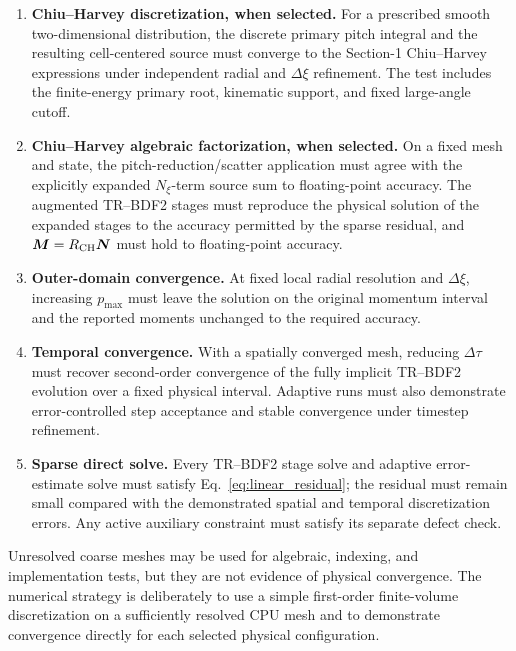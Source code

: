 \documentclass[11pt]{article}
\begin{document}
\begin{enumerate}
 \item \textbf{Chiu--Harvey discretization, when selected.}
       For a prescribed smooth two-dimensional distribution, the discrete primary pitch
       integral and the resulting cell-centered source must converge to the Section-1
       Chiu--Harvey expressions under independent radial and $\Delta\xi$ refinement.
       The test includes the finite-energy primary root, kinematic support, and fixed
       large-angle cutoff.

 \item \textbf{Chiu--Harvey algebraic factorization, when selected.}
       On a fixed mesh and state, the pitch-reduction/scatter application must agree with
       the explicitly expanded $N_\xi$-term source sum to floating-point accuracy.  The
       augmented TR--BDF2 stages must reproduce the physical solution of the expanded
       stages to the accuracy permitted by the sparse residual, and
       $\bm M=R_{\rm CH}\bm N$ must hold to floating-point accuracy.

 \item \textbf{Outer-domain convergence.}
       At fixed local radial resolution and $\Delta\xi$, increasing $p_{\max}$ must leave the solution
       on the original momentum interval and the reported moments unchanged to the
       required accuracy.

 \item \textbf{Temporal convergence.}
       With a spatially converged mesh, reducing $\Delta\tau$ must recover second-order
       convergence of the fully implicit TR--BDF2 evolution over a fixed physical
       interval.  Adaptive runs must also demonstrate error-controlled step acceptance
       and stable convergence under timestep refinement.

 \item \textbf{Sparse direct solve.}
       Every TR--BDF2 stage solve and adaptive error-estimate solve must satisfy
       Eq.~\eqref{eq:linear_residual}; the residual must remain small compared with the
       demonstrated spatial and temporal discretization errors.  Any active auxiliary
       constraint must satisfy its separate defect check.
\end{enumerate}

Unresolved coarse meshes may be used for algebraic, indexing, and implementation tests,
but they are not evidence of physical convergence.  The numerical strategy is deliberately to use a simple first-order finite-volume
discretization on a sufficiently resolved CPU mesh and to demonstrate convergence
directly for each selected physical configuration.
\end{document}
